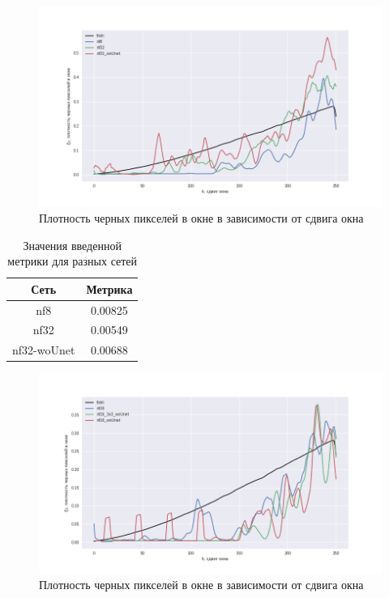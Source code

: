 \documentclass[a4paper]{article}
\begin{document}
			\begin{center}
				\begin{figure}
					\includegraphics[width=0.95\linewidth,height=0.5\textwidth]{tr_1}
					\caption{Плотность черных пикселей в окне в зависимости от сдвига окна}
				\end{figure}
			\end{center}
			\begin{table}[h]
				\begin{center}
					\begin{tabular}{|c|c|}
						\hline
						Сеть & Метрика \\
						\hline
						nf8 & 0.00825\\
						\hline
						nf32 & 0.00549\\
						\hline
						nf32-woUnet & 0.00688\\
						\hline
					\end{tabular}
					\caption{Значения введенной метрики для разных сетей}
				\end{center}
			\end{table}
			\begin{center}
				\begin{figure}
					\includegraphics[width=0.95\linewidth,height=0.5\textwidth]{tr_2}
					\caption{Плотность черных пикселей в окне в зависимости от сдвига окна}
			\end{figure}
			\end{center}
\end{document}
